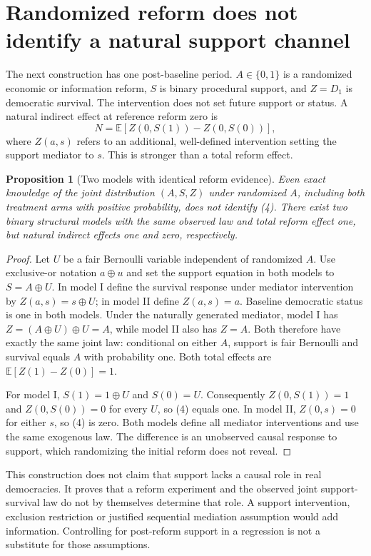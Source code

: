 \documentclass[11pt]{article}
\newtheorem{proposition}[theorem]{Proposition}
\newcommand{\E}{\mathbb E}
\begin{document}
\section{Randomized reform does not identify a natural support channel}
The next construction has one post-baseline period. $A\in\{0,1\}$ is a
randomized economic or information reform, $S$ is binary procedural
support, and $Z=D_1$ is democratic survival. The intervention does not
set future support or status. A natural indirect effect at reference
reform zero is
\[
 N=\E[Z(0,S(1))-Z(0,S(0))],                                  \tag{4}
\]
where $Z(a,s)$ refers to an additional, well-defined intervention setting
the support mediator to $s$. This is stronger than a total reform effect.

\begin{proposition}[Two models with identical reform evidence]\label{mediation}
Even exact knowledge of the joint distribution $(A,S,Z)$ under randomized
$A$, including both treatment arms with positive probability, does not
identify (4). There exist two binary structural models with the same
observed law and total reform effect one, but natural indirect effects
one and zero, respectively.
\end{proposition}
\begin{proof}
Let $U$ be a fair Bernoulli variable independent of randomized $A$.
Use exclusive-or notation $a\oplus u$ and set the support equation in both
models to $S=A\oplus U$. In model I define the survival response under
mediator intervention by $Z(a,s)=s\oplus U$; in model II define
$Z(a,s)=a$. Baseline democratic status is one in both models.
Under the naturally generated mediator, model I has
$Z=(A\oplus U)\oplus U=A$, while model II also has $Z=A$.
Both therefore have exactly the same joint law: conditional on either
$A$, support is fair Bernoulli and survival equals $A$ with probability
one. Both total effects are $\E[Z(1)-Z(0)]=1$.

For model I, $S(1)=1\oplus U$ and $S(0)=U$.
Consequently $Z(0,S(1))=1$ and $Z(0,S(0))=0$ for every $U$,
so (4) equals one. In model II, $Z(0,s)=0$ for either $s$, so (4) is
zero. Both models define all mediator interventions and use the same
exogenous law. The difference is an unobserved causal response to support,
which randomizing the initial reform does not reveal.
\end{proof}
This construction does not claim that support lacks a causal role in real
democracies. It proves that a reform experiment and the observed joint
support-survival law do not by themselves determine that role. A support
intervention, exclusion restriction or justified sequential mediation
assumption would add information. Controlling for post-reform support in
a regression is not a substitute for those assumptions.
\end{document}
